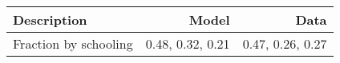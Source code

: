\begin{tabular}{lrr}
\hline
Description & Model  & Data  \\ 
\hline
Fraction by schooling & 0.48, 0.32, 0.21  & 0.47, 0.26, 0.27  \\ 
\hline
\end{tabular}%
